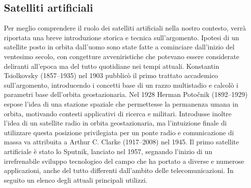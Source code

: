 \documentclass[12pt,a4paper,oneside]{book}
\begin{document}
			\subsection{Satelliti artificiali}
			Per meglio comprendere il ruolo dei satelliti artificiali nella nostro contesto, verrà riportata una breve introduzione storica e tecnica sull'argomento. Ipotesi di un satellite posto in orbita dall'uomo sono state fatte a cominciare dall'inizio del ventesimo secolo, con congetture avveniristiche che potevano essere considerate deliranti all'epoca ma del tutto quotidiane nei tempi attuali. Konstantin Tsiolkovsky (1857–1935) nel 1903 pubblicò il primo trattato accademico sull'argomento, introducendo i concetti base di un razzo multistadio e calcolò i parametri base dell'orbita geostazionaria. Nel 1928 Herman Potočnik (1892–1929) espose l'idea di una stazione spaziale che permettesse la permanenza umana in orbita, motivando contesti applicativi di ricerca e militari. Introdusse inoltre l'idea di un satellite radio in orbita geostazionaria, ma l'intuizione finale di utilizzare questa posizione privilegiata per un ponte radio e comunicazione di massa va attribuita a Arthur C. Clarke (1917–2008) nel 1945. Il primo satellite artificiale è stato lo Sputnik, lanciato nel 1957, segnando l'inizio di un irrefrenabile sviluppo tecnologico del campo che ha portato a diverse e numerose applicazioni, anche del tutto differenti dall'ambito delle telecomunicazioni. In seguito un elenco degli attuali principali utilizzi.
\end{document}
